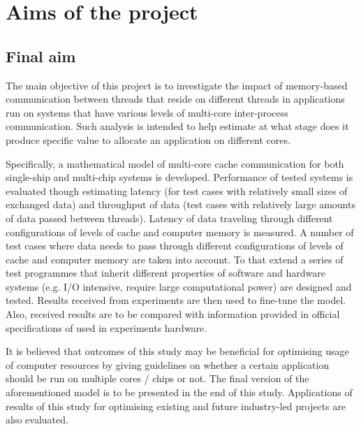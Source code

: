 
\chapter{Aims of the project} %



\section{Final aim}

The main objective of this project is to investigate the impact of memory-based communication between threads that reside on different threads in applications run on systems that have various levels of multi-core inter-process communication. Such analysis is intended to help estimate at what stage does it produce specific value to allocate an application on different cores.

Specifically, a mathematical model of multi-core cache communication for both single-ship and multi-chip systems is developed. Performance of tested systems is evaluated though estimating latency (for test cases with relatively small sizes of exchanged data) and throughput of data (test cases with relatively large amounts of data passed between threads). Latency of data traveling through different configurations of levels of cache and computer memory is measured. A number of test cases where data needs to pass through different configurations of levels of cache and computer memory are taken into account. To that extend a series of test programmes that inherit different properties of software and hardware systems (e.g. I/O intensive, require large computational power) are designed and tested. Results received from experiments are then used to fine-tune the model. Also, received results are to be compared with information provided in official specifications of used in experiments hardware.

It is believed that outcomes of this study may be beneficial for optimising usage of computer resources by giving guidelines on whether a certain application should be run on multiple cores / chips or not. The final version of the aforementioned model is to be presented in the end of this study. Applications of results of this study for optimising existing and future industry-led projects are also evaluated.

